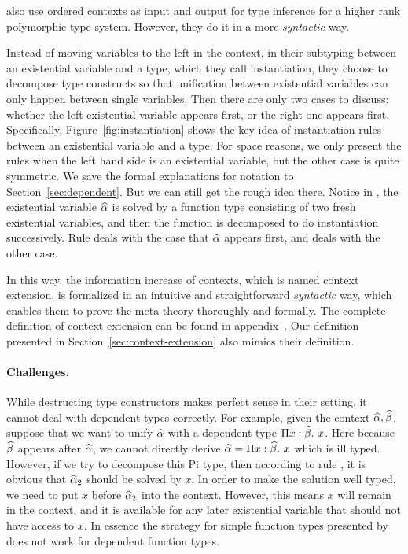 \citet{dunfield2013complete} also use ordered contexts as input and output for
type inference for a higher rank polymorphic type system. However, they do it in
a more \textit{syntactic} way.

Instead of moving variables to the left in the context, in their subtyping
between an existential variable and a type, which they call instantiation, they
choose to decompose type constructs so that unification between existential
variables can only happen between single variables.
Then there are only two cases to discuss: whether the left
existential variable appears first, or the right one appears first.
Specifically, Figure~\ref{fig:instantiation} shows the key idea of instantiation
rules between an existential variable and a type. For space reasons, we only
present the rules when the left hand side is an existential variable, but the
other case is quite symmetric. We save the formal explanations for notation
to Section~\ref{sec:dependent}. But we can still get the rough idea
there. Notice in , the existential variable $\widehat{\alpha}$ is solved by a
function type consisting of two fresh existential variables, and then the
function is decomposed to do instantiation successively. Rule 
deals with the case that $\widehat{\alpha}$ appears first, and  deals with the
other case.

In this way, the information increase of contexts, which is named context
extension, is formalized in an intuitive and straightforward \textit{syntactic}
way, which enables them to prove the meta-theory thoroughly and formally.
The complete definition of context extension can be found in
appendix~. Our
definition presented in Section~\ref{sec:context-extension} also mimics their
definition.

\paragraph{Challenges.} While destructing type constructors makes perfect sense
in their setting, it cannot deal with dependent types correctly. For example,
given the context $\widehat{\alpha}, \widehat{\beta}$, suppose that we want to unify $\widehat{\alpha}$ with a dependent
type $\Pi x:\widehat{\beta}.~ x$. Here because $\widehat{\beta}$ appears after $\widehat{\alpha}$, we cannot
directly derive $\widehat{\alpha} = \Pi x:\widehat{\beta}.~ x$ which is ill typed. However, if we try
to decompose this Pi type, then according to rule , it is obvious
that $\widehat{\alpha}_2$ should be solved by $x$. In order to make the solution well
typed, we need to put $x$ before $\widehat{\alpha}_2$ into the context. However, this means
$x$ will remain in the context, and it is available for any later existential
variable that should not have access to $x$. In essence the strategy
for simple function types presented by ~\citet{} does not work for
dependent function types. 

